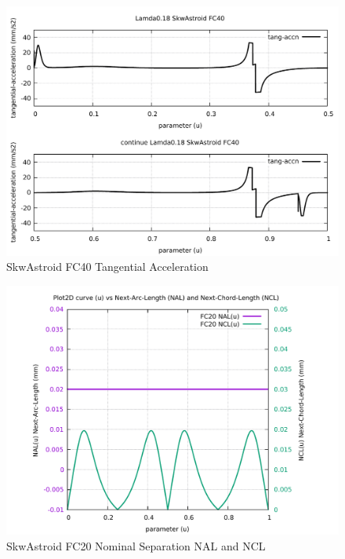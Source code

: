 \begin{figure}
	\caption     {SkwAstroid FC40 Tangential Acceleration}
	\label{24-img-SkwAstroid-FC40-Tangential-Acceleration.pdf}
	\includegraphics[width=1.00\textwidth]{Chap4/appendix/app-SkwAstroid/plots/24-img-SkwAstroid-FC40-Tangential-Acceleration.pdf}
\end{figure}

\clearpage
\pagebreak

\begin{figure}
	\caption     {SkwAstroid FC20 Nominal Separation NAL and NCL}
	\label{25-img-SkwAstroid-FC20-Nominal-Separation-NAL-and-NCL.pdf}
	\includegraphics[width=1.00\textwidth]{Chap4/appendix/app-SkwAstroid/plots/25-img-SkwAstroid-FC20-Nominal-Separation-NAL-and-NCL.pdf}
\end{figure}


